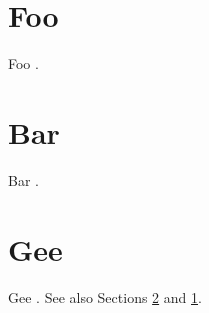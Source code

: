 \documentclass[a4paper]{article}
\begin{document}
\setcounter{page}{8}
\setcounter{section}{86}

\section{Foo}\label{sec:Foo}
Foo .

\section{Bar}\label{sec:Bar}
Bar .

\section{Gee}\label{sec:Gee}
Gee .
See also Sections \ref{sec:Bar} and \ref{sec:Foo}.
\end{document}
